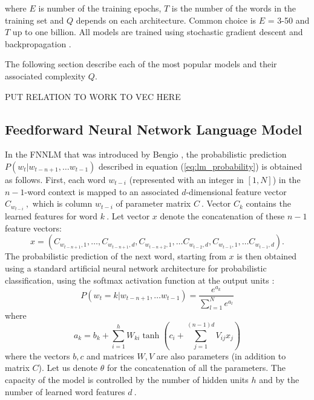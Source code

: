 where $E$ is number of the training epochs, $T$ is the number of the words in
the training set and $Q$ depends on each architecture. Common choice is $E$ = 3-50 and $T$ up to one billion.
All models are trained using stochastic gradient descent and backpropagation
\cite{Bengio:2003:NPL:944919.944966,DBLP:journals/corr/abs-1301-3781}.

The following section describe each of the most popular models and their
associated complexity $Q$.


PUT RELATION TO WORK TO VEC HERE
\subsection{Feedforward Neural Network Language Model}
\label{subsec:fwd-neural-net-lm}


In the \ac{FNNLM} that was introduced by Bengio
\cite{Bengio:2003:NPL:944919.944966},  the probabilistic prediction $P(w_t | w_{t-n+1}, \ldots w_{t-1})$ described
in equation (\ref{eq:lm_probability}) is obtained as follows. First, each word $w_{t-i}$ (represented
with an integer in $[1,N]$) in the  $n-1$-word context is mapped
to an associated $d$-dimensional feature vector $C_{w_{t-i}}\ ,$ which is
column $w_{t-i}$ of parameter matrix $C\ .$ Vector $C_k$
contains the learned features for word $k\ .$
Let vector $x$ denote the concatenation of these $n-1$
feature vectors:
\begin{equation}
  x = (C_{w_{t-n+1},1}, \ldots, C_{w_{t-n+1},d}, C_{w_{t-n+2},1}, \ldots C_{w_{t-2},d}, C_{w_{t-1},1}, \ldots C_{w_{t-1},d}).
\end{equation}
The probabilistic prediction of the next word, starting from $x$
is then obtained using a standard artificial neural network architecture
for probabilistic classification, using the softmax activation function at the output units \cite{Bishop:1995:NNP:525960}:
\begin{equation}
 P(w_t=k | w_{t-n+1}, \ldots w_{t-1}) = \frac{e^{a_k}}{\sum_{l=1}^N e^{a_l}}
\end{equation}
where
\begin{equation}
 a_k = b_k + \sum_{i=1}^h W_{ki} \tanh(c_i + \sum_{j=1}^{(n-1)d} V_{ij} x_j)
\end{equation}
where the vectors $b,c$ and matrices $W,V$ are also
parameters (in addition to matrix $C$). Let us denote
$\theta$ for the concatenation of all the parameters.
The capacity of the model is controlled by the number of hidden units $h$
and by the number of learned word features $d\ .$ 


